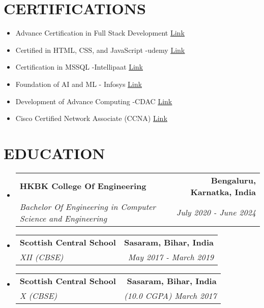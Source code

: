 \documentclass[letterpaper,11pt]{article}
\makeatletter
\newcommand{\resumeItem}[1]{
  \item\small{
    {#1 \vspace{-1pt}}
  }
}
\newcommand{\resumeSubheading}[4]{
  \vspace{-2pt}\item
    \begin{tabular*}{1.0\textwidth}[t]{l@{\extracolsep{\fill}}r}
      \textbf{\large#1} & \textbf{\small #2} \\
      \textit{\large#3} & \textit{\small #4} \\
      
    \end{tabular*}\vspace{-7pt}
}
\newcommand{\resumeSubHeadingListStart}{\begin{itemize}[leftmargin=0.0in, label={}]}
\newcommand{\resumeSubHeadingListEnd}{\end{itemize}}
\newcommand{\resumeItemListStart}{\begin{itemize}[leftmargin=0.1in]}
\newcommand{\resumeItemListEnd}{\end{itemize}\vspace{-5pt}}
\makeatother
\begin{document}
\begin{minipage}[t]{0.48\textwidth}
    \section{\color{airforceblue}CERTIFICATIONS}
    \resumeItemListStart
        \resumeItem{\normalsize{Advance Certification in Full Stack Development}}\href{https://ibharatbhushan.netlify.app/certification}{\color{blue}\underline{Link}}
        \vspace{-5pt}
        
        \resumeItem{\normalsize{Certified in HTML, CSS, and JavaScript -udemy}}\href{https://ibharatbhushan.netlify.app/assets/pdfs/web_dev.pdf}{\color{blue}\underline{Link}}
        \vspace{-5pt}
        \resumeItem{\normalsize{Certification in MSSQL -Intellipaat}}\href{https://ibharatbhushan.netlify.app/assets/pdfs/mssql.pdf}{\color{blue}\underline{Link}}
        \vspace{-5pt}
        \resumeItem{\normalsize{Foundation of AI and ML - Infosys}}\href{https://ibharatbhushan.netlify.app/assets/pdfs/1722165951450.pdf}{\color{blue}\underline{Link}}
        \vspace{-5pt}
        \resumeItem{\normalsize{
Development of Advance Computing -CDAC}}\href{https://ibharatbhushan.netlify.app/assets/pdfs/1722165709872.pdf}{\color{blue}\underline{Link}}
        \vspace{-5pt}
         \resumeItem{\normalsize{
Cisco Certified Network Associate (CCNA)}}\href{https://ibharatbhushan.netlify.app/assets/pdfs/bharat.pdf}{\color{blue}\underline{Link}}
        \vspace{-5pt}
        
        
    \resumeItemListEnd 
\end{minipage}

\vspace{-6pt}


\section{\color{airforceblue}EDUCATION}
 \resumeSubHeadingListStart
    \resumeSubheading
      {HKBK College Of Engineering}{Bengaluru, Karnatka, India}
      {Bachelor Of Engineering in Computer Science and Engineering}{July 2020 - June 2024}
    \vspace{-4pt}
     \resumeSubheading
      {Scottish Central School}{Sasaram, Bihar, India}
      {XII (CBSE)}{May 2017 - March 2019}
      \vspace{-4pt}
     \resumeSubheading
      {Scottish Central School}{Sasaram, Bihar, India}
      {X (CBSE)}{(10.0 CGPA) March 2017}
  \resumeSubHeadingListEnd
  \vspace{-10pt}
\end{document}
